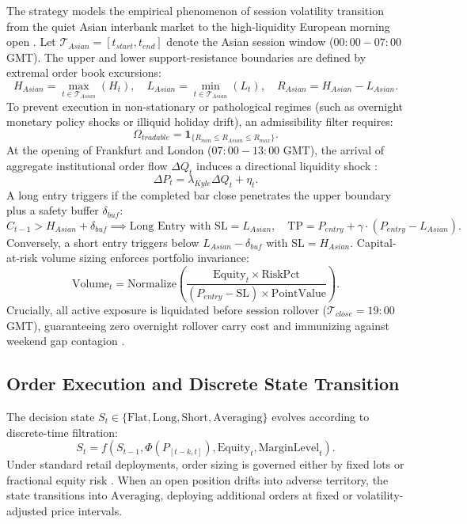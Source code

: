 \documentclass[11pt,a4paper]{article}
\begin{document}
The strategy models the empirical phenomenon of session volatility transition from the quiet Asian interbank market to the high-liquidity European morning open \cite{ito2006order, chaboud2014rise}.
Let $\mathcal{T}_{Asian} = [t_{start}, t_{end}]$ denote the Asian session window ($00:00 - 07:00$ GMT). The upper and lower support-resistance boundaries are defined by extremal order book excursions:
\begin{equation}
H_{Asian} = \max_{t \in \mathcal{T}_{Asian}} (H_t), \quad L_{Asian} = \min_{t \in \mathcal{T}_{Asian}} (L_t), \quad R_{Asian} = H_{Asian} - L_{Asian}.
\end{equation}
To prevent execution in non-stationary or pathological regimes (such as overnight monetary policy shocks or illiquid holiday drift), an admissibility filter requires:
\begin{equation}
\Omega_{tradable} = \mathbf{1}_{\{ R_{min} \le R_{Asian} \le R_{max} \}}.
\end{equation}
At the opening of Frankfurt and London ($07:00 - 13:00$ GMT), the arrival of aggregate institutional order flow $\Delta Q_t$ induces a directional liquidity shock \cite{evans2002order}:
\begin{equation}
\Delta P_t = \lambda_{Kyle} \Delta Q_t + \eta_t.
\end{equation}
A long entry triggers if the completed bar close penetrates the upper boundary plus a safety buffer $\delta_{buf}$:
\begin{equation}
C_{t-1} > H_{Asian} + \delta_{buf} \implies \text{Long Entry with } \text{SL} = L_{Asian}, \quad \text{TP} = P_{entry} + \gamma \cdot (P_{entry} - L_{Asian}).
\end{equation}
Conversely, a short entry triggers below $L_{Asian} - \delta_{buf}$ with $\text{SL} = H_{Asian}$. Capital-at-risk volume sizing enforces portfolio invariance:
\begin{equation}
\text{Volume}_t = \text{Normalize}\left(\frac{\text{Equity}_t \times \text{RiskPct}}{(P_{entry} - \text{SL}) \times \text{PointValue}}\right).
\end{equation}
Crucially, all active exposure is liquidated before session rollover ($\mathcal{T}_{close} = 19:00$ GMT), guaranteeing zero overnight rollover carry cost and immunizing against weekend gap contagion \cite{menkhoff2012currency}.


\subsection{Order Execution and Discrete State Transition}
The decision state $S_t \in \{\text{Flat}, \text{Long}, \text{Short}, \text{Averaging}\}$ evolves according to discrete-time filtration:
\begin{equation}
S_{t} = f(S_{t-1}, \Phi(P_{[t-k, t]}), \text{Equity}_t, \text{MarginLevel}_t).
\end{equation}
Under standard retail deployments, order sizing is governed either by fixed lots or fractional equity risk \cite{lopez2018advances, carhart1997persistence}. When an open position drifts into adverse territory, the state transitions into $\text{Averaging}$, deploying additional orders at fixed or volatility-adjusted price intervals.
\end{document}
